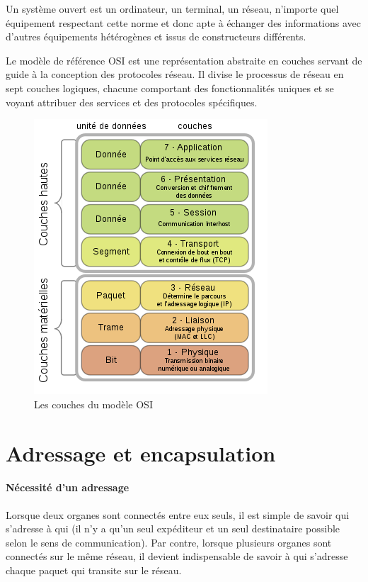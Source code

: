 \documentclass[10pt,fleqn]{article} %
\begin{document}
Un système ouvert est un ordinateur, un terminal, un réseau, n'importe quel équipement respectant cette norme et donc apte à échanger des informations avec d'autres équipements hétérogènes et issus de constructeurs différents.

Le modèle de référence OSI est une représentation abstraite en couches servant de guide à la conception des protocoles réseau. Il divise le processus de réseau en sept couches logiques, chacune comportant des fonctionnalités uniques et se voyant attribuer des services et des protocoles spécifiques.

\begin{figure}[h]
  \centering
  \includegraphics[height=.3\textheight]{img/reseau_OSI}
  \caption{Les couches du modèle OSI}
  \label{fig:res_osi}
\end{figure}

\section{Adressage et encapsulation}
\paragraph{Nécessité d'un adressage}
Lorsque deux organes sont connectés entre eux seuls, il est simple de savoir qui s'adresse à qui (il n'y a qu'un seul expéditeur et un seul destinataire possible selon le sens de communication).
Par contre, lorsque plusieurs organes sont connectés sur le même réseau, il devient indispensable de savoir à qui s'adresse chaque paquet qui transite sur le réseau.
\end{document}
